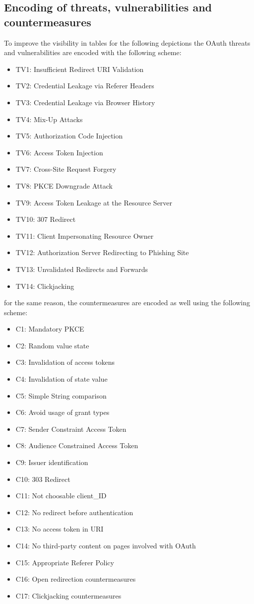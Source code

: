 \documentclass[
    fontsize=12pt,
    headings=small,
    parskip=half,           %
    bibliography=totoc,
    numbers=noenddot,       %
    open=any,               %
    ]{scrreprt}
\begin{document}
\subsection{Encoding of threats, vulnerabilities and countermeasures}
To improve the visibility in tables for the following depictions the OAuth threats and vulnerabilities are encoded with the following scheme:
\begin{itemize}
	\item TV1: Insufficient Redirect URI Validation
	\item TV2: Credential Leakage via Referer Headers
	\item TV3: Credential Leakage via Browser History
	\item TV4: Mix-Up Attacks
	\item TV5: Authorization Code Injection
	\item TV6: Access Token Injection
	\item TV7: Cross-Site Request Forgery
	\item TV8: PKCE Downgrade Attack
	\item TV9: Access Token Leakage at the Resource Server
	\item TV10: 307 Redirect
	\item TV11: Client Impersonating Resource Owner
	\item TV12: Authorization Server Redirecting to Phishing Site
	\item TV13: Unvalidated Redirects and Forwards
	\item TV14: Clickjacking
\end{itemize}

for the same reason, the countermeasures are encoded as well using the following scheme:

\begin{itemize}
	\item C1: Mandatory PKCE
	\item C2: Random value state
	\item C3: Invalidation of access tokens
	\item C4: Invalidation of state value
	\item C5: Simple String comparison
	\item C6: Avoid usage of grant types
	\item C7: Sender Constraint Access Token
	\item C8: Audience Constrained Access Token
	\item C9: Issuer identification
	\item C10: 303 Redirect
	\item C11: Not choosable client\_ID
	\item C12: No redirect before authentication
	\item C13: No access token in URI
	\item C14: No third-party content on pages involved with OAuth
	\item C15: Appropriate Referer Policy
	\item C16: Open redirection countermeasures
	\item C17: Clickjacking countermeasures
\end{itemize}
\end{document}
